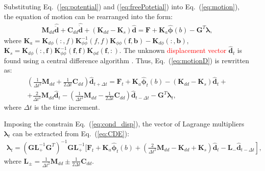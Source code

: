 \documentclass[sensors,article,submit,moreauthors,pdftex]{Definitions/mdpi}
\begin{document}
Substituting Eq.~(\ref{eq:potential}) and (\ref{eq:freePotetial}) into Eq.~(\ref{eq:motion}), the equation of motion can be rearranged into the form:
\begin{eqnarray}
\textbf{M}_{dd} \widehat{\ddot{\textbf{d}}} + \textbf{C}_{dd} \widehat{\dot{\textbf{d}}} + (\textbf{K}_{dd}-\textbf{K}_{s}) \widehat{\textbf{d}}  = \textbf{F} + \textbf{K}_{a} \widehat{\boldsymbol{\phi}}(b) - \textbf{G}^T \boldsymbol{\lambda},
\label{eq:motionD}
\end{eqnarray}
where  \(\textbf{K}_a=\textbf{K}_{d\phi}(:,f)\textbf{K}_{\phi \phi}^{-1}(f,f)\textbf{K}_{\phi \phi}(\textbf{f},\textbf{b})-\textbf{K}_{d\phi}(:,\textbf{b})\), \(\textbf{K}_s=\textbf{K}_{d \phi}(:,\textbf{f})\textbf{K}_{\phi \phi}^{-1}(\textbf{f},\textbf{f})\textbf{K}_{\phi d}(\textbf{f},:)\).
The unknown \textcolor{red}{displacement vector} \(\widehat{\textbf{d}}_t\) is found using a central difference algorithm \cite{kudela20093d}.
Thus, Eq.~(\ref{eq:motionD}) is rewritten as:
\begin{eqnarray}
\left(\frac{1}{\Delta t^2}\textbf{M}_{dd}+\frac{1}{2\Delta t}\textbf{C}_{dd} \right)\widehat{\textbf{d}}_{t+\Delta t}=
\textbf{F}_t+\textbf{K}_a\widehat{\boldsymbol{\phi}}_t(b)-\left( \textbf{K}_{dd}-\textbf{K}_s\right)\widehat{\textbf{d}}_t+\nonumber\\
+\frac{2}{\Delta t^2}\textbf{M}_{dd}\widehat{\textbf{d}}_t-\left(\frac{1}{\Delta t^2}\textbf{M}_{dd}-\frac{1}{2\Delta t}\textbf{C}_{dd}\right)\widehat{\textbf{d}}_{t-\Delta t}-\textbf{G}^T\boldsymbol{\lambda}_t,
\label{eq:CDE}
\end{eqnarray}
where \(\Delta t\) is the time increment.

Imposing the constrain Eq.~(\ref{eq:cond_disp}), the vector of Lagrange multipliers \(\boldsymbol{\lambda}_t\) can be extracted from Eq.~(\ref{eq:CDE}): 
\begin{eqnarray}
\boldsymbol{\lambda}_t = {\left(\textbf{G}\textbf{L}_+^{-1}\textbf{G}^T \right)}^{-1}\textbf{G}\textbf{L}_+^{-1} \Bigg[ \textbf{F}_t+\textbf{K}_a\widehat{\boldsymbol{\phi}}_t(b)+\left.\left(\frac{2}{\Delta t^2}\textbf{M}_{dd}-\textbf{K}_{dd}+\textbf{K}_s\right)\widehat{\textbf{d}}_t -\textbf{L}_-\widehat{\textbf{d}}_{t-\Delta t} \right],
\label{eq:lambda}
\end{eqnarray}
where \(\textbf{L}_{\pm}=\frac{1}{\Delta t^2}\textbf{M}_{dd}\pm\frac{1}{2\Delta t}\textbf{C}_{dd}\).
\end{document}

